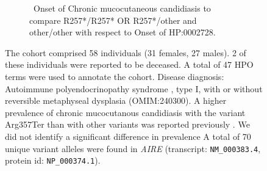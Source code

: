 \begin{figure}[htbp]
\vspace{2em}

\begin{subfigure}[b]{0.95\textwidth}
\captionsetup{justification=raggedright,singlelinecheck=false}
\caption{ Onset of Chronic mucocutaneous candidiasis to compare R257*/R257* OR R257*/other and other/other with respect to Onset of HP:0002728. }
\end{subfigure}

\vspace{2em}

\caption{ The cohort comprised 58 individuals (31 females, 27 males). 2 of these individuals were reported to be deceased. A total of 47 HPO terms were used to annotate the cohort. Disease diagnosis: Autoimmune polyendocrinopathy syndrome , type I, with or without reversible metaphyseal dysplasia (OMIM:240300). A
 higher prevalence of chronic mucocutanous candidiasis with the variant Arg357Ter than with other variants was reported previously \cite{PMID_12050215}. We did not identify a significant difference in prevalence A total of 70 unique variant alleles were found in \textit{AIRE} (transcript: \texttt{NM\_000383.4}, protein id: \texttt{NP\_000374.1}).}
\end{figure}

